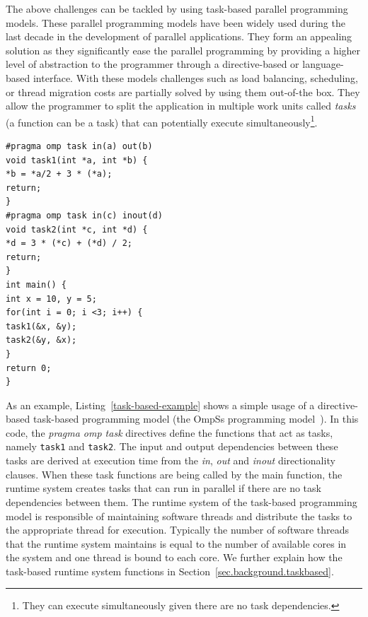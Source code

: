 The above challenges can be tackled by using task-based parallel programming models.
These parallel programming models have been widely used during the last decade in the development of parallel applications.
They form an appealing solution as they significantly ease the parallel programming by providing a higher level of abstraction to the programmer through a directive-based or language-based interface.
With these models challenges such as load balancing, scheduling, or thread migration costs are partially solved by using them out-of-the box.
They allow the programmer to split the application in multiple work units called \textit{tasks} (a function can be a task) that can potentially execute simultaneously\footnote{They can execute simultaneously given there are no task dependencies.}.
\begin{lstlisting}[float, emph={void,if,return}, captionpos=b, caption={Example code using the OmpSs task-based programming model.},label=task-based-example, emph={[2]mat}, emphstyle={[3]}, aboveskip={0\baselineskip}, frame=tb, belowskip={0\baselineskip}]
#pragma omp task in(a) out(b)
void task1(int *a, int *b) {
*b = *a/2 + 3 * (*a);
return;
}
#pragma omp task in(c) inout(d)
void task2(int *c, int *d) {
*d = 3 * (*c) + (*d) / 2;
return;
}
int main() { 
int x = 10, y = 5;
for(int i = 0; i <3; i++) {
task1(&x, &y);
task2(&y, &x);
}
return 0;
}
\end{lstlisting}
As an example, Listing~\ref{task-based-example} shows a simple usage of a directive-based task-based programming model (the OmpSs programming model~\cite{OmpSs}).
In this code, the \textit{pragma omp task} directives define the functions that act as tasks, namely \texttt{task1} and \texttt{task2}.
The input and output dependencies between these tasks are derived at execution time from the \textit{in}, \textit{out} and \textit{inout} directionality clauses.
When these task functions are being called by the main function, the runtime system creates tasks that can run in parallel if there are no task dependencies between them.
The runtime system of the task-based programming model is responsible of maintaining software threads and distribute the tasks to the appropriate thread for execution.
Typically the number of software threads that the runtime system maintains is equal to the number of available cores in the system and one thread is bound to each core.
We further explain how the task-based runtime system functions in Section~\ref{sec.background.taskbased}.


